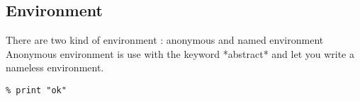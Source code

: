 \subsection{Environment}
There are two kind of environment : anonymous and named environment
Anonymous environment is use with the keyword *abstract* and let you write a nameless environment.
\begin{verbatim}
% print "ok"
\end{verbatim}
